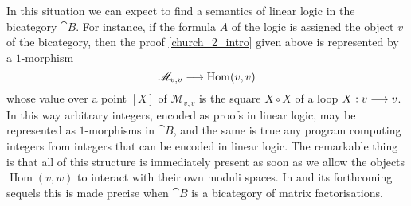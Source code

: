 \documentclass[english,letter paper,12pt,reqno]{article}
\theoremstyle{example}
\numberwithin{equation}{section}
\def\Hom{\operatorname{Hom}}
\begin{document}
In this situation we can expect to find a semantics of linear logic in the bicategory $\cat{B}$. For instance, if the formula $A$ of the logic is assigned the object $v$ of the bicategory, then the proof \eqref{church_2_intro} given above is represented by a $1$-morphism
\[
\mathscr{M}_{v,v} \lto \Hom(v,v)
\]
whose value over a point $[X]$ of $\mathscr{M}_{v,v}$ is the square $X \circ X$ of a loop $X: v \longrightarrow v$. In this way arbitrary integers, encoded as proofs in linear logic, may be represented as $1$-morphisms in $\cat{B}$, and the same is true any program computing integers from integers that can be encoded in linear logic. The remarkable thing is that all of this structure is immediately present as soon as we allow the objects $\Hom(v,w)$ to interact with their own moduli spaces. In \cite{??} and its forthcoming sequels this is made precise when $\cat{B}$ is a bicategory of matrix factorisations.



\end{document}
